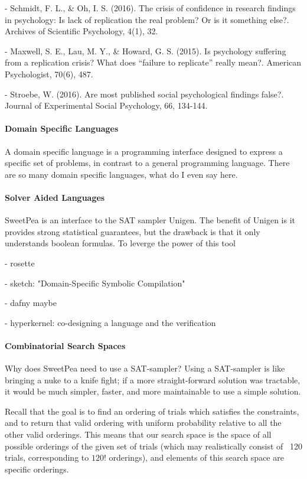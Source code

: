 - Schmidt, F. L., \& Oh, I. S. (2016). The crisis of confidence in research findings in psychology: Is lack of replication the real problem? Or is it something else?. Archives of Scientific Psychology, 4(1), 32.

- Maxwell, S. E., Lau, M. Y., \& Howard, G. S. (2015). Is psychology suffering from a replication crisis? What does “failure to replicate” really mean?. American Psychologist, 70(6), 487.

- Stroebe, W. (2016). Are most published social psychological findings false?. Journal of Experimental Social Psychology, 66, 134-144.


\paragraph*{Domain Specific Languages}

A domain specific language is a programming interface designed to express a specific set of problems, in contrast to a general programming language. There are so many domain specific languages, what do I even say here.

\paragraph*{Solver Aided Languages}

SweetPea is an interface to the SAT sampler Unigen. The benefit of Unigen is it provides strong statistical guarantees, but the drawback is that it only understands boolean formulas. To leverge the power of this tool

- rosette \cite{torlak2014lightweight}

- sketch: "Domain-Specific Symbolic Compilation"

- dafny maybe

- hyperkernel: co-designing a language and the verification


\paragraph*{Combinatorial Search Spaces}

Why does SweetPea need to use a SAT-sampler? Using a SAT-sampler is like bringing a nuke to a knife fight; if a more straight-forward solution was tractable, it would be much simpler, faster, and more maintainable to use a simple solution.

Recall that the goal is to find an ordering of trials which satisfies the constraints, and to return that valid ordering with uniform probability relative to all the other valid orderings. This means that our search space is the space of all possible orderings of the given set of trials (which may realistically consist of ~120 trials, corresponding to $120!$ orderings), and elements of this search space are specific orderings.

